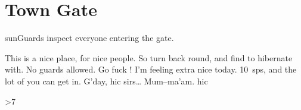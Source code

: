 \section*{Town Gate \hint{\showCycle}}

\begin{multicols}{2}

{\sffamily \Glspl{sunGuard} inspect everyone entering the gate.}

\begin{exampletext}
\ifcase\value{temperature}
  This is a nice place, for nice people.
  So turn back round, and find  to hibernate with.
\or
  No \glspl{guard} allowed.
  Go fuck !
\or
  I'm feeling extra nice today.
  10~\glspl{sp}, and the lot of you can get in.
\else
  G'day, {\tiny hic} sirs\ldots
  Mum--ma'am.
  {\tiny hic}
\fi
\end{exampletext}

\townArmoury

\townDocks

\townHealers

\townTanner

\townWeavers

\townGuardArms

\fightAdvert

\end{multicols}

\townGuardProjectiles

\bigLine

\begin{multicols}{3}

\docksNote

\townCuriosity

\rotatebox{\value{rn1t2}}{\townSignage}

\townBeasts

\townSquare

\innOne

\tavernOne

\tavernTwo

\innTwo

\townPitOfJustice

\randomize
\ifnum\value{r12}>7
\fi

\end{multicols}

